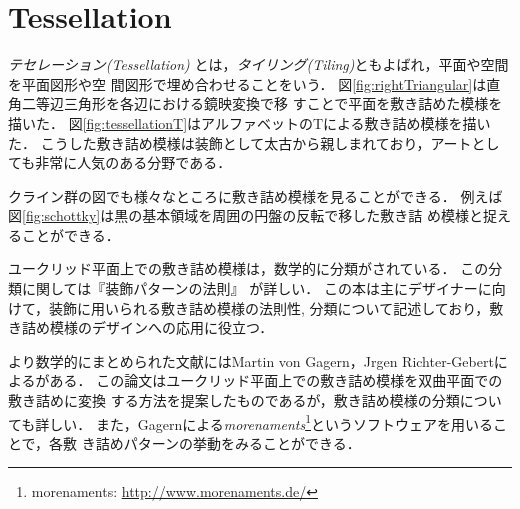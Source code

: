 
\section{Tessellation}

\emph{テセレーション}{\it (Tessellation)}
とは，\emph{タイリング}{\it(Tiling)}ともよばれ，平面や空間を平面図形や空
間図形で埋め合わせることをいう．
図\ref{fig:rightTriangular}は直角二等辺三角形を各辺における鏡映変換で移
すことで平面を敷き詰めた模様を描いた．
図\ref{fig:tessellationT}はアルファベットのTによる敷き詰め模様を描いた．
こうした敷き詰め模様は装飾として太古から親しまれており，アートとしても非常に人気のある分野である．

クライン群の図でも様々なところに敷き詰め模様を見ることができる．
例えば図\ref{fig:schottky}は黒の基本領域を周囲の円盤の反転で移した敷き詰
め模様と捉えることができる．

ユークリッド平面上での敷き詰め模様は，数学的に分類がされている．
この分類に関しては『装飾パターンの法則』
\cite{fujitaｰ201507pattern}が詳しい．
この本は主にデザイナーに向けて，装飾に用いられる敷き詰め模様の法則性,
分類について記述しており，敷き詰め模様のデザインへの応用に役立つ．

より数学的にまとめられた文献にはMartin von Gagern，Jrgen
Richter-Gebertによる\cite{journals/combinatorics/GagernR09}がある．
この論文はユークリッド平面上での敷き詰め模様を双曲平面での敷き詰めに変換
する方法を提案したものであるが，敷き詰め模様の分類についても詳しい．
また，Gagernによる\emph{morenaments}\footnote{morenaments:
\url{http://www.morenaments.de/}}というソフトウェアを用いることで，各敷
き詰めパターンの挙動をみることができる．

